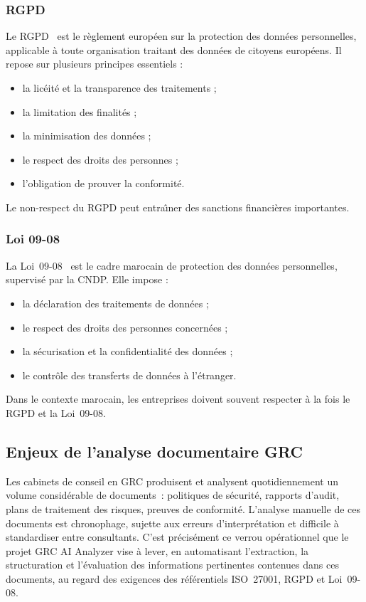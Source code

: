 \documentclass[a4paper,12pt,oneside]{report}
\begin{document}
	\subsubsection*{RGPD}
	Le RGPD~\cite{rgpd2016} est le r\`eglement europ\'een sur la protection des donn\'ees personnelles, applicable \`a toute organisation traitant des donn\'ees de citoyens europ\'eens.  
	Il repose sur plusieurs principes essentiels :
	\begin{itemize}[leftmargin=1.5em,itemsep=2pt]
		\item la lic\'eit\'e et la transparence des traitements ;
		\item la limitation des finalit\'es ;
		\item la minimisation des donn\'ees ;
		\item le respect des droits des personnes ;
		\item l'obligation de prouver la conformit\'e.
	\end{itemize}
	Le non-respect du RGPD peut entra\^\i ner des sanctions financi\`eres importantes.
	
	\subsubsection*{Loi 09-08}
	La Loi~09-08~\cite{loi0908} est le cadre marocain de protection des donn\'ees personnelles, supervis\'e par la CNDP.  
	Elle impose :
	\begin{itemize}[leftmargin=1.5em,itemsep=2pt]
		\item la d\'eclaration des traitements de donn\'ees ;
		\item le respect des droits des personnes concern\'ees ;
		\item la s\'ecurisation et la confidentialit\'e des donn\'ees ;
		\item le contr\^ole des transferts de donn\'ees \`a l'\'etranger.
	\end{itemize}
	Dans le contexte marocain, les entreprises doivent souvent respecter \`a la fois le RGPD et la Loi~09-08.
	
	\subsection{Enjeux de l'analyse documentaire GRC}
	
	Les cabinets de conseil en GRC produisent et analysent quotidiennement un volume consid\'erable de documents~: politiques de s\'ecurit\'e, rapports d'audit, plans de traitement des risques, preuves de conformit\'e. L'analyse manuelle de ces documents est chronophage, sujette aux erreurs d'interpr\'etation et difficile \`a standardiser entre consultants. C'est pr\'ecis\'ement ce verrou op\'erationnel que le projet GRC AI Analyzer vise \`a lever, en automatisant l'extraction, la structuration et l'\'evaluation des informations pertinentes contenues dans ces documents, au regard des exigences des r\'ef\'erentiels ISO~27001, RGPD et Loi~09-08.
	
\end{document}
